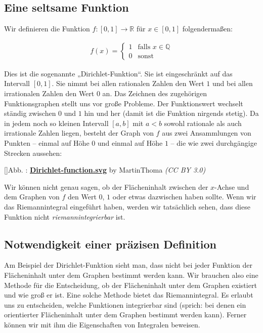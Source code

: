 \documentclass[fontsize=9pt,
               parskip=half-,
               DIV=14,
               listof=chapterentry,
               tocflat]{scrbook}
\newcounter{imagelabel}
\begin{document}
\subsection{Eine seltsame Funktion}

Wir definieren die Funktion $f:[0,1]\to \mathbb {R} $ für $x\in [0,1]$ folgendermaßen:

\begin{align*}
f(x)={\begin{cases}1&{\text{falls }}x\in \mathbb {Q} \\0&{\text{sonst}}\end{cases}}
\end{align*}

Dies ist die sogenannte „Dirichlet-Funktion“. Sie ist eingeschränkt auf das Intervall $[0,1]$. Sie nimmt bei allen rationalen Zahlen den Wert $1$ und bei allen irrationalen Zahlen den Wert $0$ an. Das Zeichnen des zugehörigen Funktionsgraphen stellt uns vor große Probleme. Der Funktionswert wechselt ständig zwischen $0$ und $1$ hin und her (damit ist die Funktion nirgends stetig). Da in jedem noch so kleinen Intervall $[a,b]$ mit $a<b$ sowohl rationale als auch irrationale Zahlen liegen, besteht der Graph von $f$ aus zwei Ansammlungen von Punkten – einmal auf Höhe $0$ und einmal auf Höhe $1$ – die wie zwei durchgängige Strecken aussehen:

[]{Abb. : \protect\href{https://commons.wikimedia.org/wiki/File:Dirichlet-function.svg}{\textbf{Dirichlet\allowbreak-function.svg}} by MartinThoma \textit{(CC BY 3.0)}}\begin{center}
\end{center}

Wir können nicht genau sagen, ob der Flächeninhalt zwischen der $x$-Achse und dem Graphen von $f$ den Wert $0$, $1$ oder etwas dazwischen haben sollte. Wenn wir das Riemannintegral eingeführt haben, werden wir tatsächlich sehen, dass diese Funktion nicht \emph{riemannintegrierbar} ist.

\subsection{Notwendigkeit einer präzisen Definition}

Am Beispiel der Dirichlet-Funktion sieht man, dass nicht bei jeder Funktion der Flächeninhalt unter dem Graphen bestimmt werden kann. Wir brauchen also eine Methode für die Entscheidung, ob der Flächeninhalt unter dem Graphen existiert und wie groß er ist. Eine solche Methode bietet das Riemannintegral. Es erlaubt uns zu entscheiden, welche Funktionen integrierbar sind (sprich: bei denen ein orientierter Flächeninhalt unter dem Graphen bestimmt werden kann). Ferner können wir mit ihm die Eigenschaften von Integralen beweisen.
\end{document}

